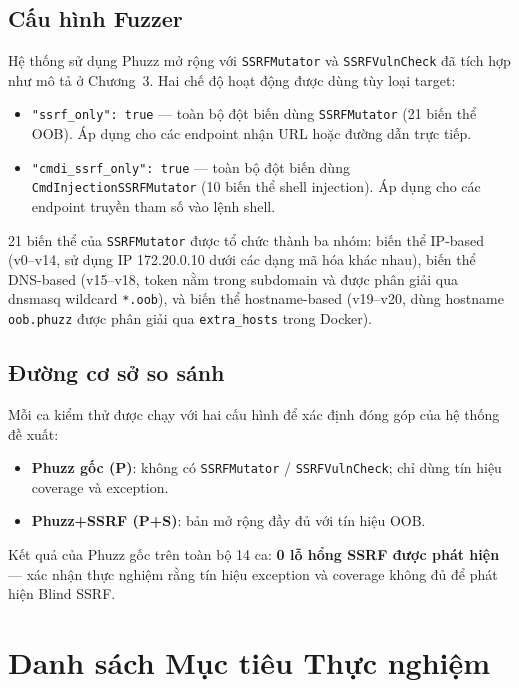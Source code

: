 \subsection{Cấu hình Fuzzer}

Hệ thống sử dụng Phuzz mở rộng với \texttt{SSRFMutator} và
\texttt{SSRFVulnCheck} đã tích hợp như mô tả ở Chương~3. Hai chế độ
hoạt động được dùng tùy loại target:

\begin{itemize}
    \item \texttt{"ssrf\_only": true} --- toàn bộ đột biến dùng
    \texttt{SSRFMutator} (21 biến thể OOB). Áp dụng cho các endpoint
    nhận URL hoặc đường dẫn trực tiếp.
    \item \texttt{"cmdi\_ssrf\_only": true} --- toàn bộ đột biến dùng
    \texttt{CmdInjectionSSRFMutator} (10 biến thể shell injection). Áp
    dụng cho các endpoint truyền tham số vào lệnh shell.
\end{itemize}

21 biến thể của \texttt{SSRFMutator} được tổ chức thành ba nhóm: biến
thể IP-based (v0--v14, sử dụng IP 172.20.0.10 dưới các dạng mã hóa
khác nhau), biến thể DNS-based (v15--v18, token nằm trong subdomain và
được phân giải qua dnsmasq wildcard \texttt{*.oob}), và biến thể
hostname-based (v19--v20, dùng hostname \texttt{oob.phuzz} được phân
giải qua \texttt{extra\_hosts} trong Docker).

\subsection{Đường cơ sở so sánh}

Mỗi ca kiểm thử được chạy với hai cấu hình để xác định đóng góp của
hệ thống đề xuất:

\begin{itemize}
    \item \textbf{Phuzz gốc (P)}: không có \texttt{SSRFMutator} /
    \texttt{SSRFVulnCheck}; chỉ dùng tín hiệu coverage và exception.
    \item \textbf{Phuzz+SSRF (P+S)}: bản mở rộng đầy đủ với tín hiệu
    OOB.
\end{itemize}

Kết quả của Phuzz gốc trên toàn bộ 14 ca: \textbf{0 lỗ hổng SSRF được
phát hiện} --- xác nhận thực nghiệm rằng tín hiệu exception và coverage
không đủ để phát hiện Blind SSRF.

\section{Danh sách Mục tiêu Thực nghiệm}
\label{sec:exp-targets}


